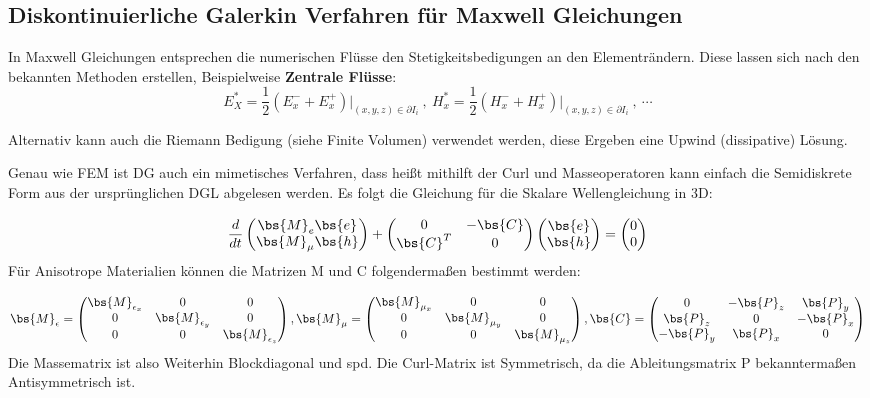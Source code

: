 \subsection{Diskontinuierliche Galerkin Verfahren f\"ur Maxwell Gleichungen}
In Maxwell Gleichungen entsprechen die numerischen Fl\"usse den Stetigkeitsbedigungen an den Elementr\"andern. Diese lassen sich nach den bekannten Methoden erstellen, Beispielweise \textbf{Zentrale Fl\"usse}:
\begin{equation*}
	E_X^* = \frac{1}{2}(E_x^- + E_x^+)\bigg|_{(x,y,z)\in\partial I_i}~,~H_x^*=\frac{1}{2}(H_x^-+H_x^+)\bigg|_{(x,y,z)\in\partial I_i}~,~\cdots
\end{equation*}
\par
Alternativ kann auch die Riemann Bedigung (siehe Finite Volumen) verwendet werden, diese Ergeben eine Upwind (dissipative) L\"osung.
\par
Genau wie FEM ist DG auch ein mimetisches Verfahren, dass hei\ss{}t mithilft der Curl und Masseoperatoren kann einfach die Semidiskrete Form aus der urspr\"unglichen DGL abgelesen werden. Es folgt die Gleichung f\"ur die Skalare Wellengleichung in 3D:
\par
\begin{equation*}
	\frac{d}{dt}\begin{pmatrix} \bs{M}_e\bs{e} \\ \bs{M}_\mu\bs{h} \end{pmatrix} + \begin{pmatrix} 0 & -\bs{C} \\ \bs{C}^T & 0 \end{pmatrix} \begin{pmatrix} \bs{e} \\ \bs{h} \end{pmatrix} = \begin{pmatrix} 0 \\ 0 \end{pmatrix}
\end{equation*}
F\"ur Anisotrope Materialien k\"onnen die Matrizen M und C folgenderma\ss{}en bestimmt werden:
\par
\begin{equation*}
	\bs{M}_\epsilon = \begin{pmatrix} \bs{M}_{\epsilon_x} & 0 & 0 \\
					0 & \bs{M}_{\epsilon_y} & 0 \\
					0 & 0 & \bs{M}_{\epsilon_z} \end{pmatrix}
					,
	\bs{M}_\mu = \begin{pmatrix} \bs{M}_{\mu_x} & 0 & 0 \\
					0 & \bs{M}_{\mu_y} & 0 \\
					0 & 0 & \bs{M}_{\mu_z} \end{pmatrix}
					,
	\bs{C} = \begin{pmatrix} 0 & -\bs{P}_z & \bs{P}_y \\
					\bs{P}_z & 0 & -\bs{P}_x  \\
					-\bs{P}_y & \bs{P}_x & 0 \end{pmatrix}
\end{equation*}
Die Massematrix ist also Weiterhin Blockdiagonal und spd. Die Curl-Matrix ist Symmetrisch, da die Ableitungsmatrix P bekannterma\ss{}en Antisymmetrisch ist.

